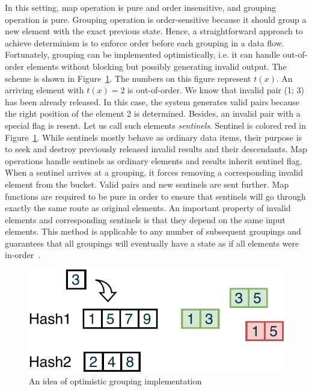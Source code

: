 In this setting, map operation is pure and order insensitive, and grouping operation is pure. Grouping operation is order-sensitive because it should group a new element with the exact previous state. Hence, a straightforward approach to achieve determinism is to enforce order before each grouping in a data flow. Fortunately, grouping can be implemented optimistically, i.e. it can handle out-of-order elements without blocking but possibly generating invalid output. The scheme is shown in Figure~\ref{optimistic-grouping}. The numbers on this figure represent $t(x)$. An arriving element with $t(x)=2$ is out-of-order. We know that invalid pair (1; 3) has been already released. In this case, the system generates valid pairs because the right position of the element 2 is determined. Besides, an invalid pair with a special flag is resent. Let us call such elements {\em sentinels}. Sentinel is colored red in Figure~\ref{optimistic-grouping}. While sentinels mostly behave as ordinary data items, their purpose is to seek and destroy previously released invalid results and their descendants. Map operations handle sentinels as ordinary elements and results inherit sentinel flag. When a sentinel arrives at a grouping, it forces removing a corresponding invalid element from the bucket. Valid pairs and new sentinels are sent further. Map functions are required to be pure in order to ensure that sentinels will go through exactly the same route as original elements. An important property of invalid elements and corresponding sentinels is that they depend on the same input elements. This method is applicable to any number of subsequent groupings and guarantees that all groupings will eventually have a state as if all elements were in-order~\cite{we2018adbis}.
 
\begin{figure}[htbp]
  \centering
  \includegraphics[width=\columnwidth]{pics/grouping-invalidation}
  \caption{An idea of optimistic grouping implementation}
  \label {optimistic-grouping}
\end{figure} 

